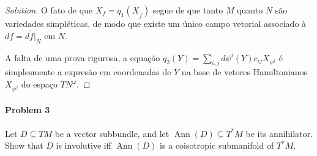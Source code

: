\begin{proof}[Solution]
	O fato de que $X_f=q_1(X_{\tilde{f}})$ segue de que tanto $M$ quanto $N$ s\~ao variedades simpl\'eticas, de modo que existe um \'unico campo vetorial associado à  $df=d\tilde{f}|_{N}$ em $N$.

       A falta de uma prova rigurosa, a equa\c c\~ao $q_2(Y)=\sum_{i,j}d\psi^i(Y)c_{ij}X_{\psi^j}$ é simplesmente a expresão em coordenadas de $Y$ na base de vetores Hamiltonianos $X_{\psi^j}$ do espaço $T N^\omega$. 
	\iffalse
	Primeiro considere o caso simples do vetor $\frac{\partial }{\partial x^i}\in TM|_{N}$ para $i\leq k$ fixa. A mudança de coordenadas $\Psi\times \operatorname{id}_{2n-k}=(\psi^1,\ldots,\psi^k,x^{k+1},\ldots,x^{2n})$ disse que
\[\frac{\partial }{\partial x^i}=\sum_{j}\frac{\partial \psi^j}{\partial x^i}V^j\]
onde $V^j$ \'e o marco de campos vetorias associado as novas coordenadas. Qual \'e esse marco? Sabemos que uma base $k$ kk


pegue um vetor tangente a $M$ ancorado sobre $N$. Podemos expressá-lo em coordenadas locais:
\[TM|_{N}\ni Y=\sum_{i=1}^kY^i\frac{\partial }{\partial x_i}+\sum_{i=k+1}^{2n}Y^i\frac{\partial }{\partial x^i}\]
Da\'i, \begin{align*}
	Y&=\sum_{i=1}^kY^i\sum_{j=1}^k\frac{\partial \psi^j}{\partial x^i}\frac{\partial }{\partial }
\end{align*}\fi
\end{proof}

\paragraph{Problem 3} Let $D\subseteq TM$ be a vector subbundle, and let $\operatorname{Ann}(D) \subseteq T^*M$ be its annihilator. Show that $D$ is involutive iff $\operatorname{Ann}(D)$ is a coisotropic submanifold of $ T^*M$.

